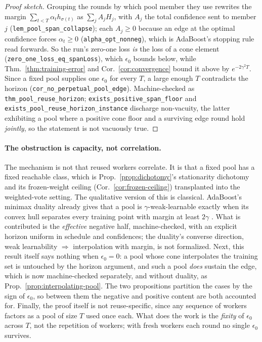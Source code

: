 \begin{proof}[Proof sketch]
Grouping the rounds by which pool member they use rewrites the margin $\sum_{t<T}\alpha_t h_{\sigma(t)}$ as $\sum_j A_j H_j$, with $A_j$ the total confidence sent to member $j$ (\texttt{lem\_pool\_span\_collapse}); each $A_j\ge0$ because an edge at the optimal confidence forces $\alpha_t\ge0$ (\texttt{alpha\_opt\_nonneg}), which is AdaBoost's stopping rule read forwards. So the run's zero-one loss \emph{is} the loss of a cone element (\texttt{zero\_one\_loss\_eq\_spanLoss}), which $\epsilon_0$ bounds below, while Thm.~\ref{thm:training-error} and Cor.~\ref{cor:convergence} bound it above by $e^{-2\gamma^2T}$. Since a fixed pool supplies one $\epsilon_0$ for every $T$, a large enough $T$ contradicts the horizon (\texttt{cor\_no\_perpetual\_pool\_edge}). Machine-checked as \texttt{thm\_pool\_reuse\_horizon}; \texttt{exists\_positive\_span\_floor} and \texttt{exists\_pool\_reuse\_horizon\_instance} discharge non-vacuity, the latter exhibiting a pool where a positive cone floor and a surviving edge round hold \emph{jointly}, so the statement is not vacuously true.
\end{proof}

\paragraph{The obstruction is capacity, not correlation.} The mechanism is not that reused workers correlate. It is that a fixed pool has a fixed reachable class, which is Prop.~\ref{prop:dichotomy}'s stationarity dichotomy and its frozen-weight ceiling (Cor.~\ref{cor:frozen-ceiling}) transplanted into the weighted-vote setting. The qualitative version of this is classical. AdaBoost's minimax duality already gives that a pool is $\gamma$-weak-learnable exactly when its convex hull separates every training point with margin at least $2\gamma$ \citep{schapire2013explaining}. What is contributed is the \emph{effective} negative half, machine-checked, with an explicit horizon uniform in schedule and confidences; the duality's converse direction, weak learnability $\Rightarrow$ interpolation with margin, is not formalized. Next, this result itself says nothing when $\epsilon_0=0$: a pool whose cone interpolates the training set is untouched by the horizon argument, and such a pool \emph{does} sustain the edge, which is now machine-checked separately, and without duality, as Prop.~\ref{prop:interpolating-pool}. The two propositions partition the cases by the sign of $\epsilon_0$, so between them the negative and positive content are both accounted for. Finally, the proof itself is not reuse-specific, since any sequence of workers factors as a pool of size $T$ used once each. What does the work is the \emph{fixity} of $\epsilon_0$ across $T$, not the repetition of workers; with fresh workers each round no single $\epsilon_0$ survives.

